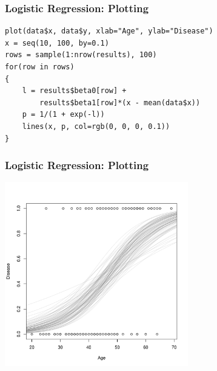 \documentclass{beamer}
\begin{document}
\begin{frame}[fragile]
\frametitle{Logistic Regression: Plotting}

\begin{verbatim}
plot(data$x, data$y, xlab="Age", ylab="Disease")
x = seq(10, 100, by=0.1)
rows = sample(1:nrow(results), 100)
for(row in rows)
{
    l = results$beta0[row] +
        results$beta1[row]*(x - mean(data$x))
    p = 1/(1 + exp(-l))
    lines(x, p, col=rgb(0, 0, 0, 0.1))
}
\end{verbatim}

\end{frame}

\begin{frame}
\frametitle{Logistic Regression: Plotting}

\begin{center}
\includegraphics[width=0.6\textwidth]{images/logistic_curves.pdf}
\end{center}

\end{frame}
\end{document}
